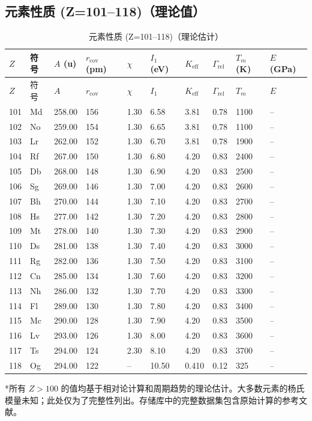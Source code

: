 \documentclass[12pt,a4paper]{article}
\newcommand{\Keff}{K_{\mathrm{eff}}}
\begin{document}
	\subsection*{元素性质 (Z=101–118)（理论值）}
	
	\begin{longtable}{p{0.6cm}p{1.2cm}p{1.2cm}p{1.2cm}p{1.2cm}p{1.2cm}p{1.5cm}p{1.2cm}p{1.2cm}p{1.2cm}}
		\caption{元素性质 (Z=101–118)（理论估计）} \label{tab:elem-data-101to118} \\
		\toprule
		\(Z\) & 符号 & \(A\) (u) & \(r_{\text{cov}}\) (pm) & \(\chi\) & \(I_1\) (eV) & \(\Keff\) & \(\Gamma_{\text{rel}}\) & \(T_m\) (K) & \(E\) (GPa) \\
		\midrule
		\endfirsthead
		\toprule
		\(Z\) & 符号 & \(A\) & \(r_{\text{cov}}\) & \(\chi\) & \(I_1\) & \(\Keff\) & \(\Gamma_{\text{rel}}\) & \(T_m\) & \(E\) \\
		\midrule
		\endhead
		101 & Md & 258.00 & 156 & 1.30 & 6.58 & 3.81 & 0.78 & 1100 & – \\
		102 & No & 259.00 & 154 & 1.30 & 6.65 & 3.81 & 0.78 & 1100 & – \\
		103 & Lr & 262.00 & 152 & 1.30 & 6.70 & 3.81 & 0.78 & 1900 & – \\
		104 & Rf & 267.00 & 150 & 1.30 & 6.80 & 4.20 & 0.83 & 2400 & – \\
		105 & Db & 268.00 & 148 & 1.30 & 6.90 & 4.20 & 0.83 & 2500 & – \\
		106 & Sg & 269.00 & 146 & 1.30 & 7.00 & 4.20 & 0.83 & 2600 & – \\
		107 & Bh & 270.00 & 144 & 1.30 & 7.10 & 4.20 & 0.83 & 2700 & – \\
		108 & Hs & 277.00 & 142 & 1.30 & 7.20 & 4.20 & 0.83 & 2800 & – \\
		109 & Mt & 278.00 & 140 & 1.30 & 7.30 & 4.20 & 0.83 & 2900 & – \\
		110 & Ds & 281.00 & 138 & 1.30 & 7.40 & 4.20 & 0.83 & 3000 & – \\
		111 & Rg & 282.00 & 136 & 1.30 & 7.50 & 4.20 & 0.83 & 3100 & – \\
		112 & Cn & 285.00 & 134 & 1.30 & 7.60 & 4.20 & 0.83 & 3200 & – \\
		113 & Nh & 286.00 & 132 & 1.30 & 7.70 & 4.20 & 0.83 & 3300 & – \\
		114 & Fl & 289.00 & 130 & 1.30 & 7.80 & 4.20 & 0.83 & 3400 & – \\
		115 & Mc & 290.00 & 128 & 1.30 & 7.90 & 4.20 & 0.83 & 3500 & – \\
		116 & Lv & 293.00 & 126 & 1.30 & 8.00 & 4.20 & 0.83 & 3600 & – \\
		117 & Ts & 294.00 & 124 & 2.30 & 8.10 & 4.20 & 0.83 & 3700 & – \\
		118 & Og & 294.00 & 122 & –    & 10.50 & 0.410 & 0.12 & 325 & – \\
		\bottomrule
	\end{longtable}
	*所有 \(Z>100\) 的值均基于相对论计算和周期趋势的理论估计。大多数元素的杨氏模量未知；此处仅为了完整性列出。存储库中的完整数据集包含原始计算的参考文献。
	
\end{document}

